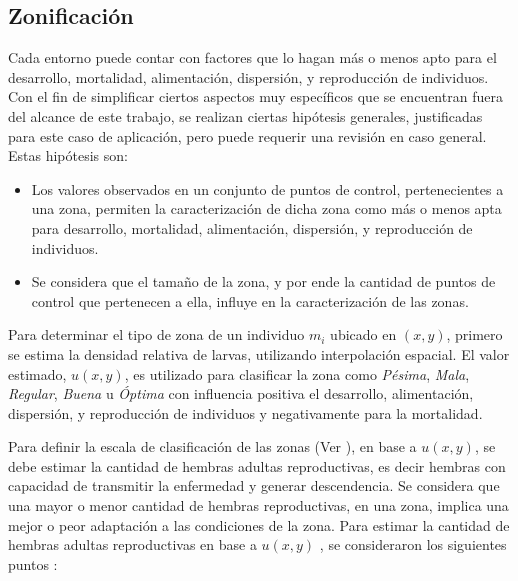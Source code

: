 \subsection{Zonificación}
\label{subsec:cap4-zonificacion}
Cada entorno puede contar con factores que lo hagan más o menos apto para el desarrollo,
mortalidad, alimentación, dispersión, y reproducción de individuos. Con el fin de
simplificar ciertos aspectos muy específicos que se encuentran fuera del alcance de este trabajo,
se realizan ciertas hipótesis generales, justificadas para este caso de aplicación, pero puede
requerir una revisión en caso general. Estas hipótesis son:
\begin{itemize}
    \item Los valores observados en un conjunto de puntos de control, pertenecientes a una zona, permiten la caracterización de dicha zona como más o menos apta para desarrollo, mortalidad, alimentación, dispersión, y reproducción de individuos.

    \item Se considera que el tamaño de la zona, y por ende la cantidad de puntos de control que pertenecen a ella, influye en la caracterización de las zonas.
\end{itemize}

Para determinar el tipo de zona de un individuo $m_{i}$ ubicado en $(x,y)$, primero se estima la
densidad relativa de larvas, utilizando interpolación espacial. El valor estimado,  $u(x,y)$, es
utilizado para clasificar la zona como \textit{Pésima}, \textit{Mala}, \textit{Regular},
\textit{Buena} u \textit{Óptima} con influencia positiva el desarrollo, alimentación, dispersión,
y reproducción de individuos y negativamente para la mortalidad.

Para definir la escala de clasificación de las zonas (Ver ), en base
a $u(x, y)$, se debe estimar la cantidad de hembras adultas reproductivas, es decir hembras con
capacidad de transmitir la enfermedad y generar descendencia. Se considera que una mayor o menor
cantidad de hembras reproductivas, en una zona, implica una mejor o peor adaptación a las
condiciones de la zona. Para estimar la cantidad de hembras adultas reproductivas en base a
$u(x, y)$ , se consideraron los siguientes puntos :


